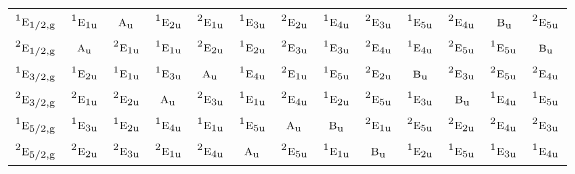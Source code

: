 \documentclass[10pt,a4paper]{article}
\numberwithin{equation}{section}
\newcommand{\irr}[1]{\text{\normalfont\scshape #1}}
\newcommand{\conjpair}[1]{{}^{#1}}
\newcommand{\ptag}[1]{\mathrm{#1}}
\begin{document}
{\begin{longtable}{@{}lcccccccccccc@{}}
$\conjpair{1}\irr{e}_{1/2,\ptag{g}}$ & $\conjpair{1}\irr{e}_{1\ptag{u}}$ & $\irr{a}_{\ptag{u}}$ & $\conjpair{1}\irr{e}_{2\ptag{u}}$ & $\conjpair{2}\irr{e}_{1\ptag{u}}$ & $\conjpair{1}\irr{e}_{3\ptag{u}}$ & $\conjpair{2}\irr{e}_{2\ptag{u}}$ & $\conjpair{1}\irr{e}_{4\ptag{u}}$ & $\conjpair{2}\irr{e}_{3\ptag{u}}$ & $\conjpair{1}\irr{e}_{5\ptag{u}}$ & $\conjpair{2}\irr{e}_{4\ptag{u}}$ & $\irr{b}_{\ptag{u}}$ & $\conjpair{2}\irr{e}_{5\ptag{u}}$\\
$\conjpair{2}\irr{e}_{1/2,\ptag{g}}$ & $\irr{a}_{\ptag{u}}$ & $\conjpair{2}\irr{e}_{1\ptag{u}}$ & $\conjpair{1}\irr{e}_{1\ptag{u}}$ & $\conjpair{2}\irr{e}_{2\ptag{u}}$ & $\conjpair{1}\irr{e}_{2\ptag{u}}$ & $\conjpair{2}\irr{e}_{3\ptag{u}}$ & $\conjpair{1}\irr{e}_{3\ptag{u}}$ & $\conjpair{2}\irr{e}_{4\ptag{u}}$ & $\conjpair{1}\irr{e}_{4\ptag{u}}$ & $\conjpair{2}\irr{e}_{5\ptag{u}}$ & $\conjpair{1}\irr{e}_{5\ptag{u}}$ & $\irr{b}_{\ptag{u}}$\\
$\conjpair{1}\irr{e}_{3/2,\ptag{g}}$ & $\conjpair{1}\irr{e}_{2\ptag{u}}$ & $\conjpair{1}\irr{e}_{1\ptag{u}}$ & $\conjpair{1}\irr{e}_{3\ptag{u}}$ & $\irr{a}_{\ptag{u}}$ & $\conjpair{1}\irr{e}_{4\ptag{u}}$ & $\conjpair{2}\irr{e}_{1\ptag{u}}$ & $\conjpair{1}\irr{e}_{5\ptag{u}}$ & $\conjpair{2}\irr{e}_{2\ptag{u}}$ & $\irr{b}_{\ptag{u}}$ & $\conjpair{2}\irr{e}_{3\ptag{u}}$ & $\conjpair{2}\irr{e}_{5\ptag{u}}$ & $\conjpair{2}\irr{e}_{4\ptag{u}}$\\
$\conjpair{2}\irr{e}_{3/2,\ptag{g}}$ & $\conjpair{2}\irr{e}_{1\ptag{u}}$ & $\conjpair{2}\irr{e}_{2\ptag{u}}$ & $\irr{a}_{\ptag{u}}$ & $\conjpair{2}\irr{e}_{3\ptag{u}}$ & $\conjpair{1}\irr{e}_{1\ptag{u}}$ & $\conjpair{2}\irr{e}_{4\ptag{u}}$ & $\conjpair{1}\irr{e}_{2\ptag{u}}$ & $\conjpair{2}\irr{e}_{5\ptag{u}}$ & $\conjpair{1}\irr{e}_{3\ptag{u}}$ & $\irr{b}_{\ptag{u}}$ & $\conjpair{1}\irr{e}_{4\ptag{u}}$ & $\conjpair{1}\irr{e}_{5\ptag{u}}$\\
$\conjpair{1}\irr{e}_{5/2,\ptag{g}}$ & $\conjpair{1}\irr{e}_{3\ptag{u}}$ & $\conjpair{1}\irr{e}_{2\ptag{u}}$ & $\conjpair{1}\irr{e}_{4\ptag{u}}$ & $\conjpair{1}\irr{e}_{1\ptag{u}}$ & $\conjpair{1}\irr{e}_{5\ptag{u}}$ & $\irr{a}_{\ptag{u}}$ & $\irr{b}_{\ptag{u}}$ & $\conjpair{2}\irr{e}_{1\ptag{u}}$ & $\conjpair{2}\irr{e}_{5\ptag{u}}$ & $\conjpair{2}\irr{e}_{2\ptag{u}}$ & $\conjpair{2}\irr{e}_{4\ptag{u}}$ & $\conjpair{2}\irr{e}_{3\ptag{u}}$\\
$\conjpair{2}\irr{e}_{5/2,\ptag{g}}$ & $\conjpair{2}\irr{e}_{2\ptag{u}}$ & $\conjpair{2}\irr{e}_{3\ptag{u}}$ & $\conjpair{2}\irr{e}_{1\ptag{u}}$ & $\conjpair{2}\irr{e}_{4\ptag{u}}$ & $\irr{a}_{\ptag{u}}$ & $\conjpair{2}\irr{e}_{5\ptag{u}}$ & $\conjpair{1}\irr{e}_{1\ptag{u}}$ & $\irr{b}_{\ptag{u}}$ & $\conjpair{1}\irr{e}_{2\ptag{u}}$ & $\conjpair{1}\irr{e}_{5\ptag{u}}$ & $\conjpair{1}\irr{e}_{3\ptag{u}}$ & $\conjpair{1}\irr{e}_{4\ptag{u}}$\\

\end{longtable}}
\end{document}
